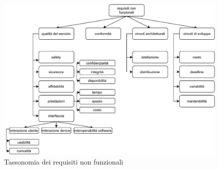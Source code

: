 \documentclass[a4paper,12pt, oneside]{book}
\begin{document}
\begin{figure}[H]
  \centering
  \includegraphics[scale = 0.7]{img/re2.pdf}
  \caption{Tassonomia dei requisiti non funzionali}
\end{figure}
\end{document}
